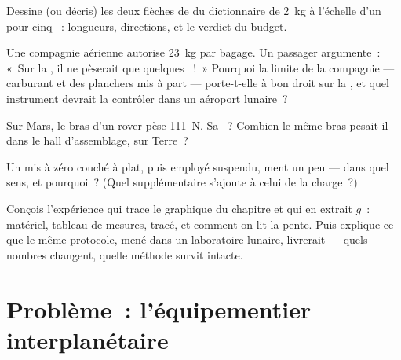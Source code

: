 \begin{exercise}[$\star$]\label{exo:g9:weight-vs-mass:8}
Dessine (ou décris) les deux flèches de  du dictionnaire de
\qty{2}{kg} à l'échelle d'un  pour cinq ~:
longueurs, directions, et le verdict du budget.
\end{exercise}

\begin{exercise}[$\star\star$]\label{exo:g9:weight-vs-mass:9}
Une compagnie aérienne autorise \qty{23}{kg} par bagage. Un passager
argumente~: «~Sur la , il ne pèserait que quelques ~!~»
Pourquoi la limite de la compagnie --- carburant et  des
planchers mis à part --- porte-t-elle à bon droit sur la , et
quel instrument devrait la contrôler dans un aéroport lunaire~?
\end{exercise}

\begin{exercise}[$\star\star$]\label{exo:g9:weight-vs-mass:10}
Sur Mars, le bras d'un rover pèse \qty{111}{N}. Sa ~? Combien le
même bras pesait-il dans le hall d'assemblage, sur Terre~?
\end{exercise}

\begin{exercise}[$\star\star$]\label{exo:g9:weight-vs-mass:11}
Un  mis à zéro couché à plat, puis employé suspendu, ment
un peu --- dans quel sens, et pourquoi~? (Quel  supplémentaire
s'ajoute à celui de la charge~?)
\end{exercise}

\begin{exercise}[$\star\star\star$]\label{exo:g9:weight-vs-mass:12}
Conçois l'expérience qui trace le graphique du chapitre et qui en
extrait $g$~: matériel, tableau de mesures, tracé, et comment on lit
la pente. Puis explique ce que le même protocole, mené dans un
laboratoire lunaire, livrerait --- quels nombres changent, quelle
méthode survit intacte.
\end{exercise}

\section{Problème~: l'équipementier interplanétaire}

